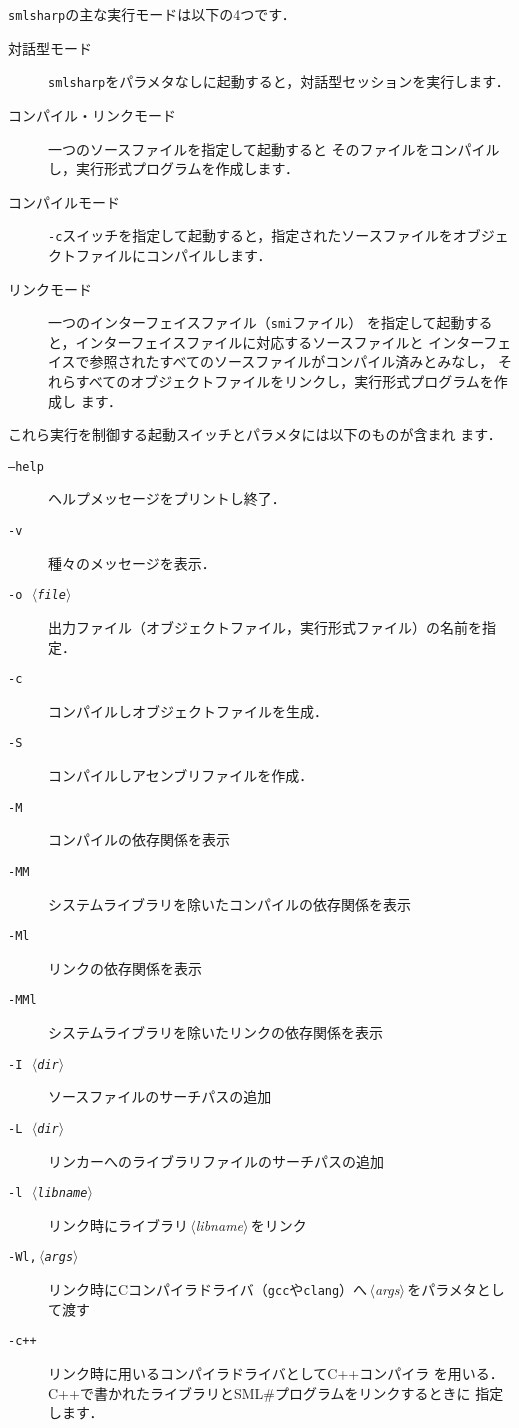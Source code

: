 \documentclass{jbook}
\newcommand{\smlsharp}{SML\#}
\newcommand{\nonterm}[1]{\mbox{$\,\langle$}{\it #1}\mbox{$\rangle\,$}}
\begin{document}
\ifjp%
	{\tt smlsharp}の主な実行モードは以下の4つです．
\begin{description}
\item[対話型モード]
{\tt smlsharp}をパラメタなしに起動すると，対話型セッションを実行します．
\item[コンパイル・リンクモード]
一つのソースファイルを指定して起動すると
そのファイルをコンパイルし，実行形式プログラムを作成します．
\item[コンパイルモード]
{\tt -c}スイッチを指定して起動すると，指定されたソースファイルをオブジェ
クトファイルにコンパイルします．
\item[リンクモード]
一つのインターフェイスファイル（{\tt smi}ファイル）
を指定して起動すると，インターフェイスファイルに対応するソースファイルと
インターフェイスで参照されたすべてのソースファイルがコンパイル済みとみなし，
それらすべてのオブジェクトファイルをリンクし，実行形式プログラムを作成し
ます．
\end{description}
	これら実行を制御する起動スイッチとパラメタには以下のものが含まれ
ます．
\begin{description}
\item[{\tt --help}] ヘルプメッセージをプリントし終了．
\item[{\tt -v}] 種々のメッセージを表示．
\item[{\tt -o \nonterm{file}}] 出力ファイル（オブジェクトファイル，実行形式ファイル）の名前を指定．
\item[{\tt -c}]  コンパイルしオブジェクトファイルを生成．
\item[{\tt -S}]  コンパイルしアセンブリファイルを作成．
\item[{\tt -M}] コンパイルの依存関係を表示
\item[{\tt -MM}] システムライブラリを除いたコンパイルの依存関係を表示
\item[{\tt -Ml}] リンクの依存関係を表示
\item[{\tt -MMl}] システムライブラリを除いたリンクの依存関係を表示
\item[{\tt -I \nonterm{dir}}] ソースファイルのサーチパスの追加
\item[{\tt -L \nonterm{dir}}] リンカーへのライブラリファイルのサーチパスの追加
\item[{\tt -l \nonterm{libname}}] リンク時にライブラリ\nonterm{libname}をリンク
\item[{\tt -Wl,\nonterm{args}}]  リンク時にCコンパイラドライバ（{\tt gcc}や{\tt clang}）へ\nonterm{args}をパラメタとして渡す
\item[{\tt -c++}] リンク時に用いるコンパイラドライバとしてC++コンパイラ
を用いる．
C++で書かれたライブラリと\smlsharp{}プログラムをリンクするときに
指定します．
\end{description}
\end{document}
